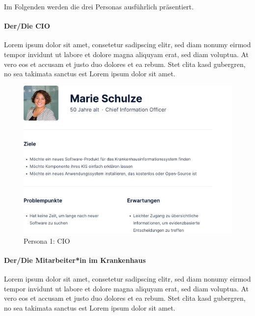 Im Folgenden werden die drei Personas ausführlich präsentiert.

\paragraph{Der/Die CIO} 

Lorem ipsum dolor sit amet, consetetur sadipscing elitr, sed diam nonumy eirmod tempor invidunt ut labore et dolore magna aliquyam erat, sed diam voluptua. 
At vero eos et accusam et justo duo dolores et ea rebum. 
Stet clita kasd gubergren, no sea takimata sanctus est Lorem ipsum dolor sit amet.

\begin{figure}[H]
	\centering
    	\includegraphics[width=1.1\textwidth]{Images/Persona_1}
   	\caption{Persona 1: CIO}
   	\label{fig:persona1}
\end{figure}

\paragraph{Der/Die Mitarbeiter*in im Krankenhaus}

Lorem ipsum dolor sit amet, consetetur sadipscing elitr, sed diam nonumy eirmod tempor invidunt ut labore et dolore magna aliquyam erat, sed diam voluptua. 
At vero eos et accusam et justo duo dolores et ea rebum. 
Stet clita kasd gubergren, no sea takimata sanctus est Lorem ipsum dolor sit amet.

